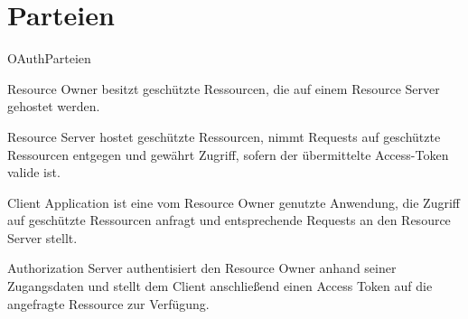 \section{Parteien}
\begin{labeling}{OAuthParteien}
    \item [Resource Owner] besitzt geschützte Ressourcen, die auf einem Resource Server gehostet werden.
    \item [Resource Server] hostet geschützte Ressourcen, nimmt Requests auf geschützte Ressourcen entgegen und gewährt Zugriff, sofern der übermittelte Access-Token valide ist.
    \item [Client Application] ist eine vom Resource Owner genutzte Anwendung, die Zugriff auf geschützte Ressourcen anfragt und entsprechende Requests an den Resource Server stellt.
    \item[Authorization Server] authentisiert den Resource Owner anhand seiner Zugangsdaten und stellt dem Client anschließend einen Access Token auf die angefragte Ressource zur Verfügung.
\end{labeling}
